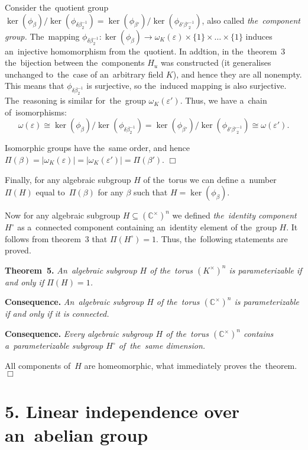 \documentclass[twoside]{article}
\begin{document}
    Consider the~quotient group $\ker(\phi_\beta) / \ker(\phi_{\delta \beta_2^{-1}}) = \ker(\phi_{\beta'}) / \ker(\phi_{\delta' {\beta'}_2^{-1}})$,
    also called \textit{the~component group.} The~mapping $\phi_{\delta \beta_2^{-1}} : \ker(\phi_\beta) \rightarrow \omega_K(\varepsilon) \times \{ 1 \} \times \ldots \times \{ 1 \}$
    induces an~injective homomorphism from the~quotient. In addtion, in the~theorem~3 the~bijection between the~components $H_u$
    was constructed (it generalises unchanged to~the~case of an~arbitrary field $K$), and hence they are all nonempty.
    This means that $\phi_{\delta \beta_2^{-1}}$ is surjective, so the~induced mapping is also surjective.
    The~reasoning is similar for~the~group $\omega_K(\varepsilon')$. Thus, we have a~chain of~isomorphisms:
    $$
        \omega(\varepsilon) \cong \ker(\phi_\beta) / \ker(\phi_{\delta \beta_2^{-1}}) = \ker(\phi_{\beta'}) / \ker(\phi_{\delta' {\beta'}_2^{-1}}) \cong \omega(\varepsilon').
    $$

    Isomorphic groups have the~same order, and hence $\Pi(\beta) = |\omega_K(\varepsilon)| = |\omega_K(\varepsilon')| = \Pi(\beta')$.
\hfill$\Box$\medskip

Finally, for any algebraic subgroup $H$ of the~torus we can define a~number $\Pi(H)$ equal to~$\Pi(\beta)$
for any $\beta$ such that $H = \ker(\phi_\beta)$.

Now for any algebraic subgroup $H \subseteq (\mathbb{C}^\times)^n$ we defined \textit{the~identity component} $H^\circ$
as a~connected component containing an~identity element of the~group $H$. It follows from theorem~3
that $\Pi(H^\circ) = 1$. Thus, the~following statements are proved.

\medskip\noindent\textbf{Theorem~5.}\emph{
    An~algebraic subgroup $H$ of the~torus $(K^\times)^n$ is parameterizable if and only if $\Pi(H) = 1$.
}

\medskip\noindent\textbf{Consequence.}\emph{
    An~algebraic subgroup $H$ of the~torus $(\mathbb{C}^\times)^n$ is parameterizable if and only if it is connected.
}

\medskip\noindent\textbf{Consequence.}\emph{
    Every algebraic subgroup $H$ of the~torus $(\mathbb{C}^\times)^n$ contains a~parameterizable subgroup $H^\circ$ of~the~same dimension.
}\medskip

    All components of~$H$ are homeomorphic, what immediately proves the~theorem.
\hfill$\Box$\medskip

\section*{5. Linear independence over an~abelian group}
\end{document}
